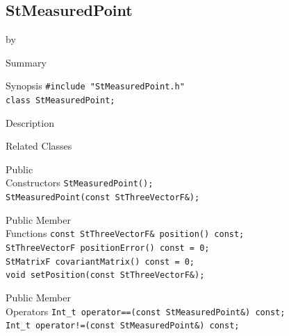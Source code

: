 \documentclass[twoside]{article}
\newcommand{\entrylabel}[1]{\mbox{\textbf{{#1}}}\hfil}%
\newenvironment{entry}
{\begin{list}{}%
    {\renewcommand{\makelabel}{\entrylabel}%
     \setlength{\labelwidth}{90pt}%
     \setlength{\leftmargin}{\labelwidth}
     \advance\leftmargin by \labelsep%
      }%
    }%
  {\end{list}}
\newcommand{\Entrylabel}[1]%
{\raisebox{0pt}[1ex][0pt]{\makebox[\labelwidth][l]%
    {\parbox[t]{\labelwidth}{\hspace{0pt}\textbf{{#1}}}}}}
\newenvironment{Entry}%
{\renewcommand{\entrylabel}{\Entrylabel}\begin{entry}}%
  {\end{entry}}
\begin{document}
\subsection{StMeasuredPoint}
\label{sec:StMeasuredPoint}
\begin{Entry}
\item[Summary]
\item[Synopsis]
    \verb+#include "StMeasuredPoint.h"+\\
    \verb+class StMeasuredPoint;+\\
\item[Description]
\item[Related Classes]
\item[Public\\ Constructors]
    \verb+StMeasuredPoint();+\\
    \verb+StMeasuredPoint(const StThreeVectorF&);+\\
\item[Public Member\\ Functions]
    \verb+const StThreeVectorF& position() const;+\\
    \verb+StThreeVectorF positionError() const = 0;+\\
    \verb+StMatrixF covariantMatrix() const = 0;+\\
    \verb+void setPosition(const StThreeVectorF&);+\\
\item[Public Member\\ Operators]
    \verb+Int_t operator==(const StMeasuredPoint&) const;+\\
    \verb+Int_t operator!=(const StMeasuredPoint&) const;+\\
\end{Entry}
\clearpage
\end{document}
